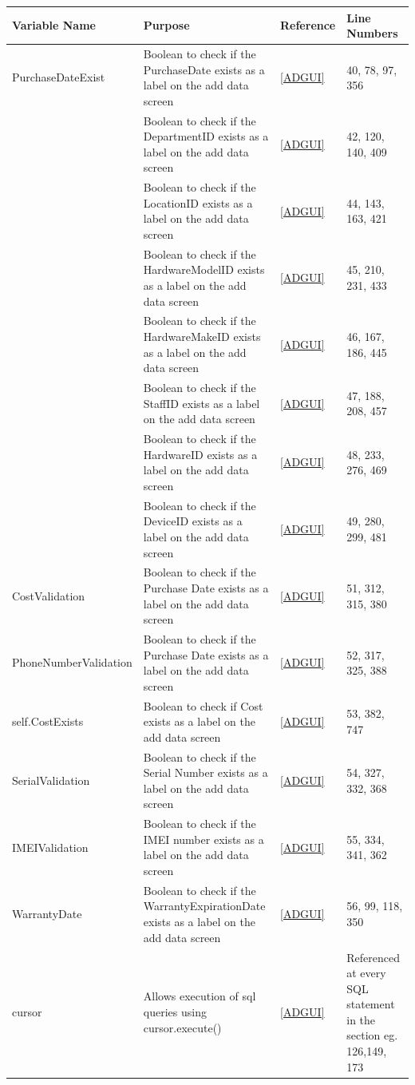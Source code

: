 \begin{center}
    \begin{longtable}{|p{4cm}|p{3cm}|p{2cm}|p{3cm}|}
    \hline
	\textbf{Variable Name} & \textbf{Purpose} & \textbf{Reference}&  \textbf{Line Numbers} \\ \hline

PurchaseDateExist & Boolean to check if the PurchaseDate exists as a label on the add data screen  & \ref{ADGUI} & 40, 78, 97, 356  \\ \hline
\verb DepartmentID_CB & Boolean to check if the DepartmentID exists as a label on the add data screen  & \ref{ADGUI} &42, 120, 140, 409  \\ \hline
\verb LocationID_CB & Boolean to check if the LocationID exists as a label on the add data screen  & \ref{ADGUI} &44, 143, 163, 421 \\ \hline
\verb HardwareModelID_CB & Boolean to check if the HardwareModelID exists as a label on the add data screen & \ref{ADGUI} &45, 210, 231, 433   \\ \hline
\verb HardwareMakeID_CB & Boolean to check if the HardwareMakeID exists as a label on the add data screen  & \ref{ADGUI} & 46, 167, 186, 445    \\ \hline
\verb StaffID_CB & Boolean to check if the StaffID exists as a label on the add data screen & \ref{ADGUI} & 47, 188, 208, 457  \\ \hline
\verb HardwareID_CB & Boolean to check if the HardwareID exists as a label on the add data screen  & \ref{ADGUI} & 48, 233, 276, 469 \\ \hline
\verb DeviceID_CB & Boolean to check if the DeviceID exists as a label on the add data screen & \ref{ADGUI} & 49, 280, 299, 481   \\ \hline
CostValidation & Boolean to check if the Purchase Date exists as a label on the add data screen & \ref{ADGUI} &51, 312, 315, 380 \\ \hline
PhoneNumberValidation & Boolean to check if the Purchase Date exists as a label on the add data screen & \ref{ADGUI} & 52, 317, 325, 388 \\ \hline
self.CostExists & Boolean to check if Cost exists as a label on the add data screen  & \ref{ADGUI} & 53, 382, 747  \\ \hline
SerialValidation & Boolean to check if the Serial Number exists as a label on the add data screen  & \ref{ADGUI} &54, 327, 332, 368  \\ \hline
IMEIValidation & Boolean to check if the IMEI number exists as a label on the add data screen  & \ref{ADGUI} &55, 334, 341, 362 \\ \hline
WarrantyDate &  Boolean to check if the WarrantyExpirationDate exists as a label on the add data screen & \ref{ADGUI} &56, 99, 118, 350  \\ \hline
cursor & Allows execution of sql queries using cursor.execute()& \ref{ADGUI} & Referenced at every SQL statement in the section eg. 126,149, 173  \\ \hline


\end{longtable}
\end{center}
